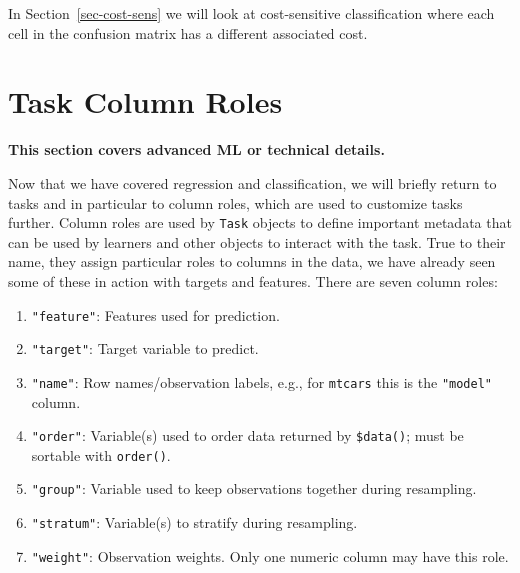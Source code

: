 In Section~\ref{sec-cost-sens} we will look at cost-sensitive
classification where each cell in
the confusion matrix has a different associated cost.

\hypertarget{sec-row-col-roles}{%
\section{Task Column Roles}\label{sec-row-col-roles}}

\begin{tcolorbox}[enhanced jigsaw, colframe=quarto-callout-note-color-frame, rightrule=.15mm, bottomrule=.15mm, toprule=.15mm, opacityback=0, colback=white, left=2mm, arc=.35mm, breakable, leftrule=.75mm]
\begin{minipage}[t]{5.5mm}
\textcolor{quarto-callout-note-color}{\faInfo}
\end{minipage}%
\begin{minipage}[t]{\textwidth - 5.5mm}

\textbf{This section covers advanced ML or technical
details.}\vspace{2mm}

\end{minipage}%
\end{tcolorbox}

Now that we have covered regression and classification, we will briefly
return to tasks and in particular to column roles,
which are used to customize tasks further. Column roles are used by
\texttt{Task} objects to define important metadata that can be used by
learners and other objects to interact with the task. True to their
name, they assign particular roles to columns in the data, we have
already seen some of these in action with targets and features. There
are seven column roles:

\begin{enumerate}
\def\labelenumi{\arabic{enumi}.}
\tightlist
\item
  \texttt{"feature"}: Features used for prediction.
\item
  \texttt{"target"}: Target variable to predict.
\item
  \texttt{"name"}: Row names/observation labels, e.g., for
  \texttt{mtcars} this is the \texttt{"model"} column.
\item
  \texttt{"order"}: Variable(s) used to order data returned by
  \texttt{\$data()}; must be sortable with \texttt{order()}.
\item
  \texttt{"group"}: Variable used to keep observations together during
  resampling.
\item
  \texttt{"stratum"}: Variable(s) to stratify during resampling.
\item
  \texttt{"weight"}: Observation weights. Only one numeric column may
  have this role.
\end{enumerate}

